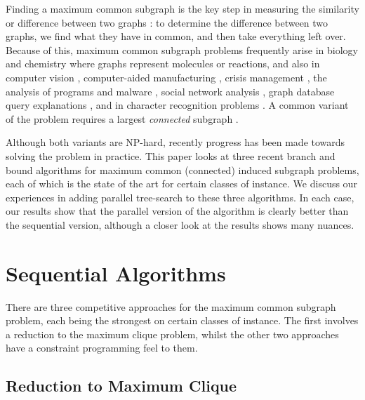 \documentclass[sigconf]{acmart}
\begin{document}
Finding a maximum common subgraph is the key step in measuring the similarity or difference between
two graphs \citep{DBLP:journals/prl/Bunke97,DBLP:journals/prl/FernandezV01,o:Kriege15}: to determine
the difference between two graphs, we find what they have in common, and then take everything left
over. Because of this, maximum common subgraph problems frequently arise in biology and chemistry
\citep{DBLP:journals/jcamd/RaymondW02a,o:EhrlichR11,DBLP:journals/dam/GayFMSS14} where graphs
represent molecules or reactions, and also in computer vision
\citep{DBLP:journals/jair/CookH94,DBLP:conf/gbrpr/CombierDS13}, computer-aided manufacturing
\citep{o:LuoWSN17}, crisis management \citep{o:DelavalladeFLL16}, the analysis of programs and
malware \citep{DBLP:conf/icics/GaoRS08,DBLP:journals/compsec/ParkRS13}, social network analysis
\citep{DBLP:journals/tkde/FangYZZ15}, graph database query explanations
\citep{DBLP:journals/jcss/VasilyevaTBL16}, and in character recognition problems
\citep{DBLP:journals/pr/LuRS91}.  A common variant of the problem requires a largest
\emph{connected} subgraph
\citep{DBLP:journals/tcs/Koch01,DBLP:journals/jcamd/RaymondW02a,DBLP:conf/mco/VismaraV08,o:EhrlichR11,o:LuoWSN17}.


Although both variants are NP-hard, recently progress has been made towards solving the problem in
practice.  This paper looks at three recent branch and bound algorithms for maximum common
(connected) induced subgraph problems, each of which is the state of the art for certain classes of
instance. We discuss our experiences in adding parallel tree-search to these three algorithms. In
each case, our results show that the parallel version of the algorithm is clearly better than the
sequential version, although a closer look at the results shows many nuances.

\section{Sequential Algorithms}

There are three competitive approaches for the maximum common subgraph problem, each being the
strongest on certain classes of instance. The first involves a reduction to the maximum clique
problem, whilst the other two approaches have a constraint programming feel to them.

\subsection{Reduction to Maximum Clique}
\end{document}
